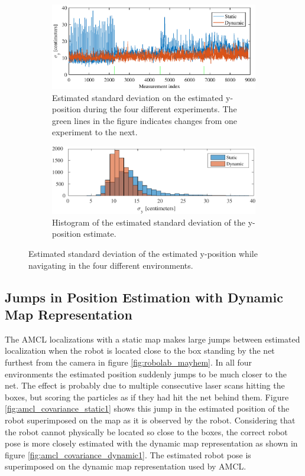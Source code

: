 \begin{figure}[htbp]
	\begin{subfigure}[t]{1\textwidth}	
		\centering	
		\includegraphics[scale=1.0]{chapters/evaluation/figures/location_data_y}	
		\caption{Estimated standard deviation on the estimated y-position during the four different experiments. The green lines in the figure indicates changes from one experiment to the next.}
		\label{fig:location_data_y}
	\end{subfigure}
	
	\begin{subfigure}[t]{1\textwidth}
		\centering
		\includegraphics[scale=1.0]{chapters/evaluation/figures/location_data_hist_y-crop}
		\caption{Histogram of the estimated standard deviation of the y-position estimate.}
		\label{fig:location_data_hist_y}
	\end{subfigure}
	\caption{Estimated standard deviation of the estimated y-position while navigating in the four different environments.}
	\label{fig:location_y_evaluation}
\end{figure}

\subsection{Jumps in Position Estimation with Dynamic Map Representation}
The AMCL localizations with a static map makes large jumps between estimated localization when the robot is located close to the box standing by the net furthest from the camera in figure \ref{fig:robolab_mayhem}. 
In all four environments the estimated position suddenly jumps to be much closer to the net. 
The effect is probably due to multiple consecutive laser scans hitting the boxes, but scoring the particles as if they had hit the net behind them.
Figure \ref{fig:amcl_covariance_static1} shows this jump in the estimated position of the robot superimposed on the map as it is observed by the robot.
Considering that the robot cannot physically be located so close to the boxes, the correct robot pose is more closely estimated with the dynamic map representation as shown in figure \ref{fig:amcl_covariance_dynamic1}.
The estimated robot pose is superimposed on the dynamic map representation used by AMCL.

